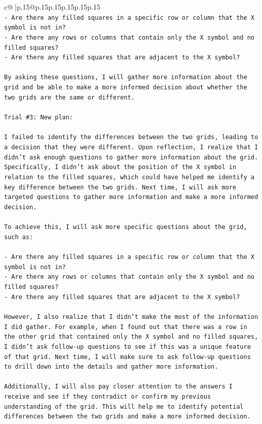 \documentclass{article}
\begin{document}
{\begin{supertabular}{c@{$\;$}|p{.15\linewidth}@{}p{.15\linewidth}p{.15\linewidth}p{.15\linewidth}p{.15\linewidth}p{.15\linewidth}}
{{{\\ 
\texttt{{-} Are there any filled squares in a specific row or column that the X symbol is not in?} \\
\texttt{{-} Are there any rows or columns that contain only the X symbol and no filled squares?} \\
\texttt{{-} Are there any filled squares that are adjacent to the X symbol?} \\
\\ 
\texttt{By asking these questions, I will gather more information about the grid and be able to make a more informed decision about whether the two grids are the same or different.} \\
\\ 
\texttt{Trial \#3: New plan: } \\
\\ 
\texttt{I failed to identify the differences between the two grids, leading to a decision that they were different. Upon reflection, I realize that I didn't ask enough questions to gather more information about the grid. Specifically, I didn't ask about the position of the X symbol in relation to the filled squares, which could have helped me identify a key difference between the two grids. Next time, I will ask more targeted questions to gather more information and make a more informed decision.} \\
\\ 
\texttt{To achieve this, I will ask more specific questions about the grid, such as:} \\
\\ 
\texttt{{-} Are there any filled squares in a specific row or column that the X symbol is not in?} \\
\texttt{{-} Are there any rows or columns that contain only the X symbol and no filled squares?} \\
\texttt{{-} Are there any filled squares that are adjacent to the X symbol?} \\
\\ 
\texttt{However, I also realize that I didn't make the most of the information I did gather. For example, when I found out that there was a row in the other grid that contained only the X symbol and no filled squares, I didn't ask follow{-}up questions to see if this was a unique feature of that grid. Next time, I will make sure to ask follow{-}up questions to drill down into the details and gather more information.} \\
\\ 
\texttt{Additionally, I will also pay closer attention to the answers I receive and see if they contradict or confirm my previous understanding of the grid. This will help me to identify potential differences between the two grids and make a more informed decision.} \\
}}}
\end{supertabular}}
\end{document}
